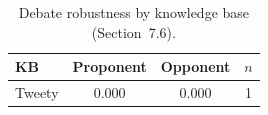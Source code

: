 \begin{table}[t]
\centering
\caption{Debate robustness by knowledge base (Section~7.6).}
\label{tab:debate-robustness}
\begin{tabular}{lccc}
\toprule
KB & Proponent & Opponent & $n$ \\
\midrule
  Tweety & 0.000 & 0.000 & 1 \\
\bottomrule
\end{tabular}
\end{table}
